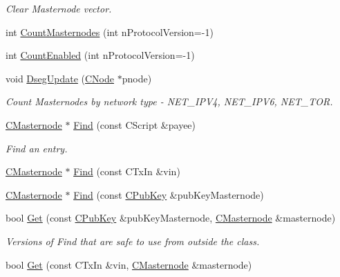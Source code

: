 \begin{DoxyCompactItemize}
\begin{DoxyCompactList}\small\item\em Clear Masternode vector. \end{DoxyCompactList}\item 
int \mbox{\hyperlink{class_c_masternode_man_a5c78b438e09a102ce2a2aaf6964e89b0}{Count\+Masternodes}} (int n\+Protocol\+Version=-\/1)
\item 
int \mbox{\hyperlink{class_c_masternode_man_a0088c44c990f88340c2fcc66829734a2}{Count\+Enabled}} (int n\+Protocol\+Version=-\/1)
\item 
void \mbox{\hyperlink{class_c_masternode_man_a5aa389cb63e70edf9fd9e2eb7fe90750}{Dseg\+Update}} (\mbox{\hyperlink{class_c_node}{C\+Node}} $\ast$pnode)
\begin{DoxyCompactList}\small\item\em Count Masternodes by network type -\/ N\+E\+T\+\_\+\+I\+P\+V4, N\+E\+T\+\_\+\+I\+P\+V6, N\+E\+T\+\_\+\+T\+OR. \end{DoxyCompactList}\item 
\mbox{\hyperlink{class_c_masternode}{C\+Masternode}} $\ast$ \mbox{\hyperlink{class_c_masternode_man_a3d34836c6992d29c485ba94a0c1e0ae6}{Find}} (const C\+Script \&payee)
\begin{DoxyCompactList}\small\item\em Find an entry. \end{DoxyCompactList}\item 
\mbox{\hyperlink{class_c_masternode}{C\+Masternode}} $\ast$ \mbox{\hyperlink{class_c_masternode_man_aade63e2fbea916e7051819015ef31dc5}{Find}} (const C\+Tx\+In \&vin)
\item 
\mbox{\hyperlink{class_c_masternode}{C\+Masternode}} $\ast$ \mbox{\hyperlink{class_c_masternode_man_a2dddce0ba7602d92e5a7b18e28147d3c}{Find}} (const \mbox{\hyperlink{class_c_pub_key}{C\+Pub\+Key}} \&pub\+Key\+Masternode)
\item 
bool \mbox{\hyperlink{class_c_masternode_man_a041219927e10752e5669a93568103c97}{Get}} (const \mbox{\hyperlink{class_c_pub_key}{C\+Pub\+Key}} \&pub\+Key\+Masternode, \mbox{\hyperlink{class_c_masternode}{C\+Masternode}} \&masternode)
\begin{DoxyCompactList}\small\item\em Versions of Find that are safe to use from outside the class. \end{DoxyCompactList}\item 
bool \mbox{\hyperlink{class_c_masternode_man_ada3c5493b0b52ff5d8fbb041705a9ec8}{Get}} (const C\+Tx\+In \&vin, \mbox{\hyperlink{class_c_masternode}{C\+Masternode}} \&masternode)

\end{DoxyCompactItemize}
